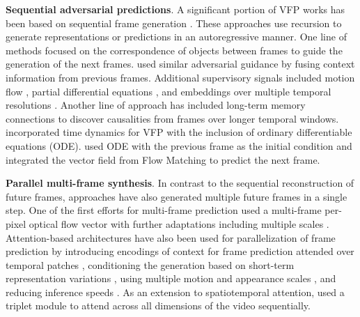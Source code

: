 \noindent
\textbf{Sequential adversarial predictions}. A significant portion of VFP works has been based on sequential frame generation \citep{castrejon2019improved,chaabane2020looking,chang2021mau,chang2022strpm,chen2017learning,guen2020disentangling,hwang2019adversarial,jin2020exploring,liang2017dual,villegas2018hierarchical,wang2018predrnn++,wu2021motionrnn}. These approaches use recursion to generate representations or predictions in an autoregressive manner. One line of methods \citep{chen2017learning,jin2017video} focused on the correspondence of objects between frames to guide the generation of the next frames. \citet{castrejon2019improved} used similar adversarial guidance by fusing context information from previous frames. Additional supervisory signals included motion flow \citep{liang2017dual}, partial differential equations \citep{guen2020disentangling}, and embeddings over multiple temporal resolutions \citep{gao2022simvp}. Another line of approach \citep{chang2021mau,villegas2018hierarchical,wang2018predrnn++} has included long-term memory connections to discover causalities from frames over longer temporal windows. \citet{park2021vid} incorporated time dynamics for VFP with the inclusion of ordinary differentiable equations (ODE). \citet{davtyan2023efficient} used ODE with the previous frame as the initial condition and integrated the vector field from Flow Matching \citep{lipman2022flow} to predict the next frame. 


\noindent
\textbf{Parallel multi-frame synthesis}. In contrast to the sequential reconstruction of future frames, approaches have also generated multiple future frames in a single step. One of the first efforts for multi-frame prediction \citep{liu2017video} used a multi-frame per-pixel optical flow vector with further adaptations including multiple scales \citep{hu2023dynamic}. Attention-based architectures have also been used for parallelization of frame prediction by introducing encodings of context for frame prediction attended over temporal patches \citep{tan2023temporal,ye2023unified}, conditioning the generation based on short-term representation variations \citep{hu2023dynamic,smith2024convolutional}, using multiple motion and appearance scales \citep{zhong2023mmvp}, and reducing inference speeds \citep{ye2022vptr,tang2024vmrnn}. As an extension to spatiotemporal attention, \citet{nie2024triplet} used a triplet module to attend across all dimensions of the video sequentially.

